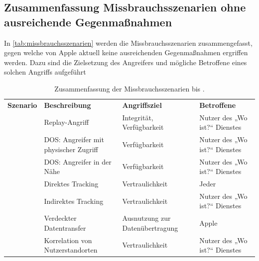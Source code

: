\subsection{Zusammenfassung Missbrauchsszenarien ohne ausreichende Gegenmaßnahmen}
In \autoref{tab:missbrauchsszenarien} werden die Missbrauchsszenarien zusammengefasst, gegen welche von Apple aktuell keine ausreichenden Gegenmaßnahmen ergriffen werden.
Dazu sind die Zielsetzung des Angreifers und mögliche Betroffene eines solchen Angriffs aufgeführt

\begin{table}[ht]
  \caption{Zusammenfassung der Missbrauchsszenarien  bis .}
  \label{tab:missbrauchsszenarien}
  \begin{tabularx}{\textwidth}{ |l|X|X|X| }
    \hline
    \textbf{Szenario} & \textbf{Beschreibung} & \textbf{Angriffsziel} & \textbf{Betroffene}\\
    \Xhline{0.5mm}
    \hline
    \nameref{missbrauch:1} & Replay-Angriff & Integrität, Verfügbarkeit & Nutzer des „Wo ist?“ Dienstes \\
    \hline
    \nameref{missbrauch:2.1} & \ac{DOS}: Angreifer mit physischer Zugriff & Verfügbarkeit & Nutzer des „Wo ist?“ Dienstes \\
    \hline
    \nameref{missbrauch:2.2} & \ac{DOS}: Angreifer in der Nähe & Verfügbarkeit & Nutzer des „Wo ist?“ Dienstes \\
    \hline
    \nameref{missbrauch:3} & Direktes Tracking & Vertraulichkeit & Jeder \\
    \hline
    \nameref{missbrauch:4} & Indirektes Tracking & Vertraulichkeit & Nutzer des „Wo ist?“ Dienstes  \\
    \hline
    \nameref{missbrauch:5} & Verdeckter Datentransfer & Ausnutzung zur Datenübertragung & Apple \\
    \hline
    \nameref{missbrauch:6} & Korrelation von Nutzerstandorten & Vertraulichkeit & Nutzer des „Wo ist?“ Dienstes \\
    \hline
  \end{tabularx}
\end{table}
